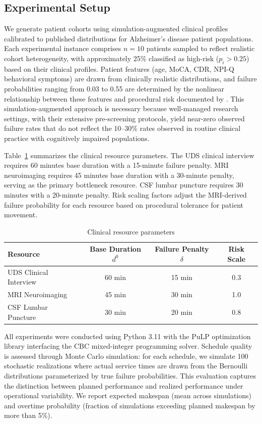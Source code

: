 \documentclass[11pt,a4paper]{article}
\begin{document}
\subsection{Experimental Setup}
\label{sec:experimental_setup}

We generate patient cohorts using simulation-augmented clinical profiles calibrated to published distributions for Alzheimer's disease patient populations. Each experimental instance comprises $n = 10$ patients sampled to reflect realistic cohort heterogeneity, with approximately 25\% classified as high-risk ($p_i > 0.25$) based on their clinical profiles. Patient features (age, MoCA, CDR, NPI-Q behavioral symptoms) are drawn from clinically realistic distributions, and failure probabilities ranging from 0.03 to 0.55 are determined by the nonlinear relationship between these features and procedural risk documented by \citet{porembka2025disparities}. This simulation-augmented approach is necessary because well-managed research settings, with their extensive pre-screening protocols, yield near-zero observed failure rates that do not reflect the 10--30\% rates observed in routine clinical practice with cognitively impaired populations.

Table~\ref{tab:resource_params} summarizes the clinical resource parameters. The UDS clinical interview requires 60 minutes base duration with a 15-minute failure penalty. MRI neuroimaging requires 45 minutes base duration with a 30-minute penalty, serving as the primary bottleneck resource. CSF lumbar puncture requires 30 minutes with a 20-minute penalty. Risk scaling factors adjust the MRI-derived failure probability for each resource based on procedural tolerance for patient movement.

\begin{table}[htbp]
\centering
\caption{Clinical resource parameters}
\label{tab:resource_params}
\begin{tabular}{@{}lccc@{}}
\toprule
\textbf{Resource} & \textbf{Base Duration} $d^0$ & \textbf{Failure Penalty} $\delta$ & \textbf{Risk Scale} \\
\midrule
UDS Clinical Interview & 60 min & 15 min & 0.3 \\
MRI Neuroimaging & 45 min & 30 min & 1.0 \\
CSF Lumbar Puncture & 30 min & 20 min & 0.8 \\
\bottomrule
\end{tabular}
\end{table}

All experiments were conducted using Python 3.11 with the PuLP optimization library interfacing the CBC mixed-integer programming solver. Schedule quality is assessed through Monte Carlo simulation: for each schedule, we simulate 100 stochastic realizations where actual service times are drawn from the Bernoulli distributions parameterized by true failure probabilities. This evaluation captures the distinction between planned performance and realized performance under operational variability. We report expected makespan (mean across simulations) and overtime probability (fraction of simulations exceeding planned makespan by more than 5\%).
\end{document}
